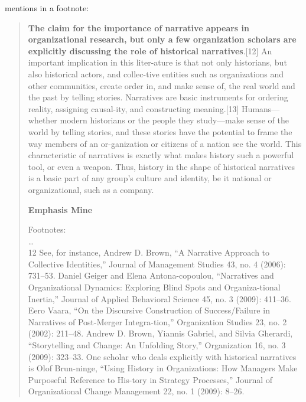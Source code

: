 \cite[pp.696--7]{hansen2012business} mentions \cite{geiger2009narratives} in a footnote:\\
\begin{quote}
{\bf The claim for the importance of narrative appears in organizational research, but only a few organization scholars are explicitly discussing the role of historical narratives}.[12] An important implication in this liter-ature  is  that  not  only  historians,  but  also  historical  actors,  and  collec-tive entities such as organizations and other communities, create order in,  and  make  sense  of,  the  real  world  and  the  past  by  telling  stories.  Narratives are basic instruments for ordering reality, assigning causal-ity, and constructing meaning.[13] Humans—whether modern historians or  the  people  they  study—make  sense  of  the  world  by  telling  stories,  and these stories have the potential to frame the way members of an or-ganization  or  citizens  of  a  nation  see  the  world.  This  characteristic  of  narratives is exactly what makes history such a powerful tool, or even a weapon.  Thus,  history  in  the  shape  of  historical  narratives  is  a  basic  part of any group’s culture and identity, be it national or organizational, such as a company.\\
\begin{flushright}
{\bf Emphasis Mine} \\
\end{flushright}

Footnotes:\\

\ldots \\
12  See,  for  instance,  Andrew  D.  Brown,  “A  Narrative  Approach  to  Collective  Identities,”  Journal of Management Studies 43, no. 4 (2006): 731–53. Daniel Geiger and Elena Antona-copoulou,  “Narratives  and  Organizational  Dynamics:  Exploring  Blind  Spots  and  Organiza-tional Inertia,” Journal of Applied Behavioral Science 45, no. 3 (2009): 411–36. Eero Vaara, “On  the  Discursive  Construction  of  Success/Failure  in  Narratives  of  Post-Merger  Integra-tion,” Organization  Studies  23,  no.  2  (2002):  211–48.  Andrew  D.  Brown,  Yiannis  Gabriel,  and Silvia Gherardi, “Storytelling and Change: An Unfolding Story,” Organization 16, no. 3 (2009):  323–33.  One  scholar  who  deals  explicitly  with  historical  narratives  is  Olof  Brun-ninge, “Using History in Organizations: How Managers Make Purposeful Reference to His-tory  in  Strategy  Processes,”  Journal  of  Organizational  Change  Management  22,  no.  1  (2009): 8–26.\\
\end{quote}

